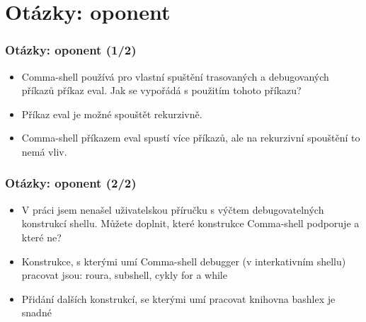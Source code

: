 \documentclass{beamer}
\newcommand{\backupend}{
   \setcounter{framenumber}{\value{finalframe}}
}
\begin{document}
\section{Otázky: oponent}

\begin{frame}
	\frametitle{Otázky: oponent (1/2)}
	\begin{exampleblock}{}
		\begin{itemize}
			\item Comma-shell používá pro vlastní spuštění trasovaných a debugovaných příkazů příkaz eval.
Jak se vypořádá s použitím tohoto příkazu?
		\end{itemize}
	\end{exampleblock}
	\begin{alertblock}{}
	   \begin{itemize}
			\item Příkaz eval je možné spouštět rekurzivně.
			\item Comma-shell příkazem eval spustí více příkazů, ale na rekurzivní spouštění to nemá vliv.
		\end{itemize}
	\end{alertblock}	
\end{frame}

\begin{frame}
	\frametitle{Otázky: oponent (2/2)}
	\begin{exampleblock}{}
		\begin{itemize}
			\item V práci jsem nenašel uživatelskou příručku s výčtem debugovatelných konstrukcí shellu.
Můžete doplnit, které konstrukce Comma-shell podporuje a které ne?
		\end{itemize}
	\end{exampleblock}
	\begin{alertblock}{}
	   \begin{itemize}
			\item Konstrukce, s kterými umí Comma-shell debugger (v interkativním shellu) pracovat jsou: roura, subshell, cykly for a while
			\item Přidání dalších konstrukcí, se kterými umí pracovat knihovna bashlex je snadné
		\end{itemize}
	\end{alertblock}	
\end{frame}


\backupend
\end{document}

